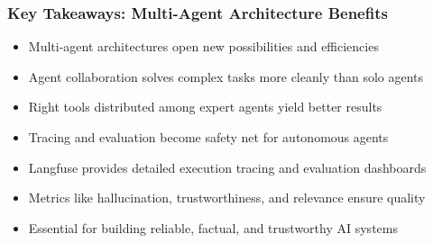\begin{frame}[fragile]\frametitle{Key Takeaways: Multi-Agent Architecture Benefits}

      \begin{itemize}
		\item Multi-agent architectures open new possibilities and efficiencies
		\item Agent collaboration solves complex tasks more cleanly than solo agents
		\item Right tools distributed among expert agents yield better results
		\item Tracing and evaluation become safety net for autonomous agents
		\item Langfuse provides detailed execution tracing and evaluation dashboards
		\item Metrics like hallucination, trustworthiness, and relevance ensure quality
		\item Essential for building reliable, factual, and trustworthy AI systems
	  \end{itemize}

\end{frame}